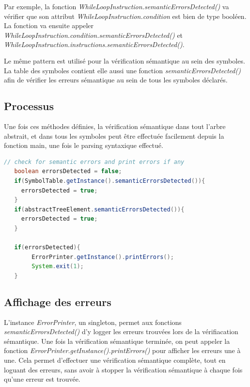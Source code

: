\documentclass[11pt,a4paper]{article}
\begin{document}
  \par Par exemple, la fonction \textit{WhileLoopInstruction.semanticErrorsDetected()} va vérifier que son attribut \textit{WhileLoopInstruction.condition} est bien de type booléen. La fonction va ensuite appeler \textit{WhileLoopInstruction.condition.semanticErrorsDetected()} et \\ \textit{WhileLoopInstruction.instructions.semanticErrorsDetected()}. 
  
  \par Le même pattern est utilisé pour la vérification sémantique au sein des symboles. La table des symboles contient elle aussi une fonction \textit{semanticErrorsDetected()} afin de vérifier les erreurs sémantique au sein de tous les symboles déclarés. 
  
  \subsection{Processus}
  
  \par Une fois ces méthodes définies, la vérification sémantique dans tout l'arbre abstrait, et dans tous les symboles peut être effectuée facilement depuis la fonction main, une fois le parsing syntaxique effectué. 
  
    \begin{lstlisting}[language=java,caption={Processus de vérification syntaxique}]
   // check for semantic errors and print errors if any
   boolean errorsDetected = false;
   if(SymbolTable.getInstance().semanticErrorsDetected()){
     errorsDetected = true;
   }
   if(abstractTreeElement.semanticErrorsDetected()){
     errorsDetected = true;
   }

   if(errorsDetected){
     	ErrorPrinter.getInstance().printErrors();
      	System.exit(1);
   }
   \end{lstlisting}
   
  \newpage
  \subsection{Affichage des erreurs}
  
  \par L'instance \textit{ErrorPrinter}, un singleton, permet aux fonctions \textit{semanticErrorsDetected()} d'y logger les erreurs trouvées lors de la vérifiacation sémantique. Une fois la vérification sémantique terminée, on peut appeler la fonction \textit{ErrorPrinter.getInstance().printErrors()} pour afficher les erreurs une à une. Cela permet d'effectuer une vérification sémantique complète, tout en loguant des erreurs, sans avoir à stopper la vérification sémantique à chaque fois qu'une erreur est trouvée. 
  
\end{document}
